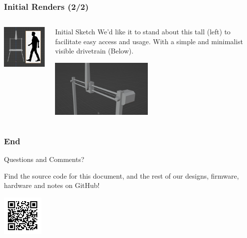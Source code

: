 \documentclass{beamer}
\begin{document}
\begin{frame}
\frametitle{Initial Renders (2/2)}

\begin{columns}
    \begin{column}{0.48\textwidth}
        \includegraphics[width=5cm]{Scale}
    \end{column}
    \begin{column}{0.48\textwidth}
        \begin{block}{Initial Sketch}
            We'd like it to stand about this tall (left) to facilitate easy access
            and usage. With a simple and minimalist visible drivetrain (Below).
        \end{block}
        \includegraphics[width=5cm]{UpperAssy}
    \end{column}
\end{columns}

\end{frame}


\begin{frame}
\frametitle{End}

\begin{block}{}
    \begin{center}
        \Huge Questions and Comments?
    \end{center}
\end{block}

\begin{center}
    Find the source code for this document, and the rest of our designs, firmware, hardware
    and notes on GitHub!

    \includegraphics[height=2cm]{github_qr}
\end{center}

\end{frame}
\end{document}
